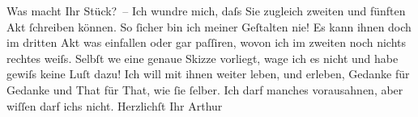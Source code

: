 \pstart
           Was macht Ihr Stück? – Ich
               wundre mich, daſs Sie zugleich zweiten und fünften Akt ſchreiben können. So ſicher
               bin ich meiner Geſtalten nie! Es kann ihnen doch im dritten Akt {\pb}was einfallen oder gar paſſiren, wovon ich im zweiten noch
               nichts rechtes weiſs. Selbſt we{\geminationn} eine genaue Skizze
               vorliegt, wage ich es nicht und habe gewiſs keine Luſt dazu! Ich will mit ihnen
               weiter leben, und erleben, Gedanke für Gedanke und That für That, wie ſie ſelber. Ich
               darf manches vorausahnen, aber wiſſen darf ichs nicht.\pend
           \pstart Herzlichſt Ihr \spacefill\mbox{Arthur}\pend{}\endnumbering{}  
      